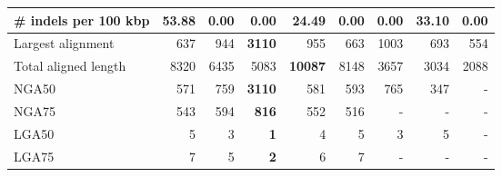 \documentclass[12pt,a4paper]{article}
\begin{document}
\begin{table}[ht]
\begin{center}
\begin{tabular}{|l*{8}{|r}|}
\# indels per 100 kbp & 53.88 & {\bf 0.00} & {\bf 0.00} & 24.49 & {\bf 0.00} & {\bf 0.00} & 33.10 & {\bf 0.00} \\ \hline
Largest alignment & 637 & 944 & {\bf 3110} & 955 & 663 & 1003 & 693 & 554 \\ \hline
Total aligned length & 8320 & 6435 & 5083 & {\bf 10087} & 8148 & 3657 & 3034 & 2088 \\ \hline
NGA50 & 571 & 759 & {\bf 3110} & 581 & 593 & 765 & 347 & - \\ \hline
NGA75 & 543 & 594 & {\bf 816} & 552 & 516 & - & - & - \\ \hline
LGA50 & 5 & 3 & {\bf 1} & 4 & 5 & 3 & 5 & - \\ \hline
LGA75 & 7 & 5 & {\bf 2} & 6 & 7 & - & - & - \\ \hline
\end{tabular}
\end{center}
\end{table}
\end{document}
